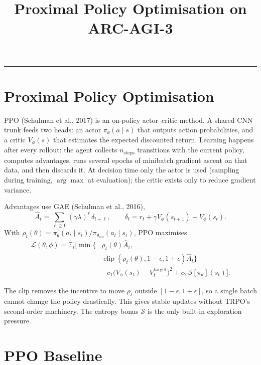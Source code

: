 \documentclass[11pt,a4paper]{article}
\title{\vspace{-1.2em}\Huge\bfseries\color{headingblue} Proximal Policy Optimisation on ARC-AGI-3}
\author{}
\date{}
\begin{document}
\maketitle
\vspace{-2.2em}
\hrule
\vspace{1.4em}

\section{Proximal Policy Optimisation}

PPO (Schulman et al., 2017) is an on-policy actor--critic method. A shared CNN trunk feeds two heads: an actor $\pi_\theta(a\mid s)$ that outputs action probabilities, and a critic $V_\phi(s)$ that estimates the expected discounted return. Learning happens after every rollout: the agent collects $n_{\text{steps}}$ transitions with the current policy, computes advantages, runs several epochs of minibatch gradient ascent on that data, and then discards it. At decision time only the actor is used (sampling during training, $\arg\max$ at evaluation); the critic exists only to reduce gradient variance.

Advantages use GAE (Schulman et al., 2016),
\begin{equation}
  \hat A_t = \sum_{\ell\geq 0}(\gamma\lambda)^\ell\,\delta_{t+\ell},
  \qquad
  \delta_t = r_t + \gamma V_\phi(s_{t+1}) - V_\phi(s_t).
\end{equation}
With $\rho_t(\theta)=\pi_\theta(a_t\mid s_t)/\pi_{\theta_{\mathrm{old}}}(a_t\mid s_t)$, PPO maximises
\begin{equation}
\begin{aligned}
  \mathcal{L}(\theta,\phi) = \mathbb{E}_t\Big[\min\big\{&\rho_t(\theta)\hat A_t,\\
    &\operatorname{clip}(\rho_t(\theta),1-\epsilon,1+\epsilon)\hat A_t\big\}\\[-0.1em]
    &-c_1\big(V_\phi(s_t)-V_t^{\mathrm{target}}\big)^2
      +c_2\,\mathcal{S}[\pi_\theta](s_t)\Big].
\end{aligned}
\end{equation}

The clip removes the incentive to move $\rho_t$ outside $[1-\epsilon,1+\epsilon]$, so a single batch cannot change the policy drastically. This gives stable updates without TRPO's second-order machinery. The entropy bonus $\mathcal{S}$ is the only built-in exploration pressure.

\section{PPO Baseline}
\end{document}
